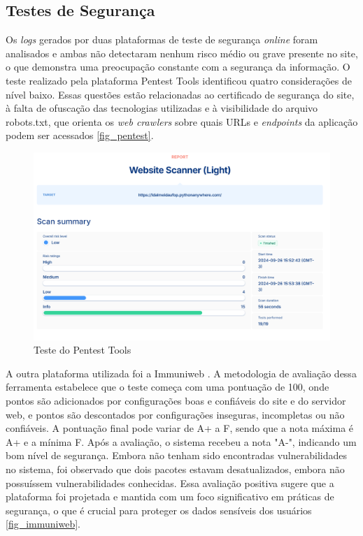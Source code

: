 \subsection{Testes de Segurança}

Os \textit{logs} gerados por duas plataformas de teste de segurança \textit{online} foram analisados e ambas não detectaram nenhum risco médio ou grave presente no site, o que demonstra uma preocupação constante com a segurança da informação. O teste realizado pela plataforma Pentest Tools \cite{Pentest} identificou quatro considerações de nível baixo. Essas questões estão relacionadas ao certificado de segurança do site, à falta de ofuscação das tecnologias utilizadas e à visibilidade do arquivo robots.txt, que orienta os \textit{web crawlers} sobre quais \ac{URLs} e \textit{endpoints} da aplicação podem ser acessados \autoref{fig_pentest}.

\begin{figure}[htb] \caption{\label{fig_pentest}Teste do Pentest Tools} \begin{center} \includegraphics[scale=0.5]{./img/pentest.png} \end{center}  \end{figure}

A outra plataforma utilizada foi a Immuniweb \cite{Immuniweb}. A metodologia de avaliação dessa ferramenta estabelece que o teste começa com uma pontuação de 100, onde pontos são adicionados por configurações boas e confiáveis do site e do servidor web, e pontos são descontados por configurações inseguras, incompletas ou não confiáveis. A pontuação final pode variar de A+ a F, sendo que a nota máxima é A+ e a mínima F. Após a avaliação, o sistema recebeu a nota "A-", indicando um bom nível de segurança. Embora não tenham sido encontradas vulnerabilidades no sistema, foi observado que dois pacotes estavam desatualizados, embora não possuíssem vulnerabilidades conhecidas. Essa avaliação positiva sugere que a plataforma foi projetada e mantida com um foco significativo em práticas de segurança, o que é crucial para proteger os dados sensíveis dos usuários \autoref{fig_immuniweb}.

